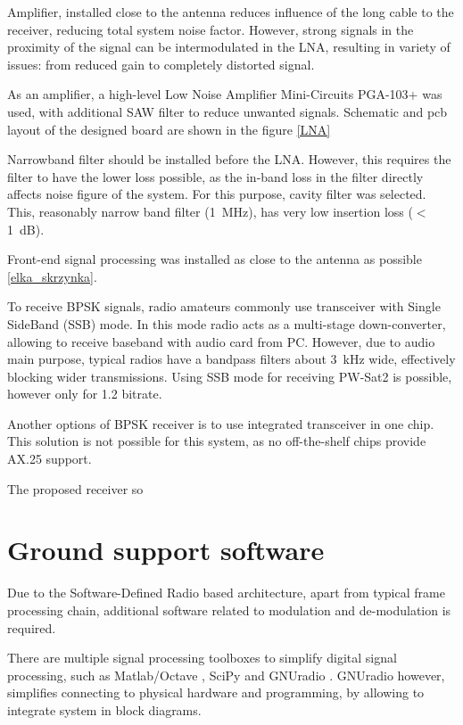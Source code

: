 
Amplifier, installed close to the antenna reduces influence of the long cable to the receiver, reducing total system noise factor. However, strong signals in the proximity of the signal can be intermodulated in the LNA, resulting in variety of issues: from reduced gain to completely distorted signal.

As an amplifier, a high-level Low Noise Amplifier Mini-Circuits PGA-103+ was used, with additional SAW filter to reduce unwanted signals. Schematic and pcb layout of the designed board are shown in the figure \ref{LNA}


Narrowband filter should be installed before the LNA. However, this requires the filter to have the lower loss possible, as the in-band loss in the filter directly affects noise figure of the system. For this purpose, cavity filter was selected. This, reasonably narrow band filter (\SI{1}{\MHz}), has very low insertion loss ($<$\SI{1}{\dB}).

Front-end signal processing was installed as close to the antenna as possible \ref{elka_skrzynka}.




To receive BPSK signals, radio amateurs commonly use transceiver with Single SideBand  (SSB) mode. In this mode radio acts as a multi-stage down-converter, allowing to receive baseband with audio card from PC. However, due to audio main purpose, typical radios have a bandpass filters about \SI{3}{\kHz} wide, effectively blocking wider transmissions. Using SSB mode for receiving PW-Sat2 is possible, however only for \SI{1.2}{\kbps} bitrate.

Another options of BPSK receiver is to use integrated transceiver in one chip. This solution is not possible for this system, as no off-the-shelf chips provide AX.25 support.

The proposed receiver so



\section{Ground support software}
Due to the Software-Defined Radio based architecture, apart from typical frame processing chain, additional software related to modulation and de-modulation is required.

There are multiple signal processing toolboxes to simplify digital signal processing, such as Matlab/Octave \cite{Matlab}, SciPy \cite{Scipy} and GNUradio \cite{Gnuradio}. GNUradio however, simplifies connecting to physical hardware and programming, by allowing to integrate system in block diagrams.

